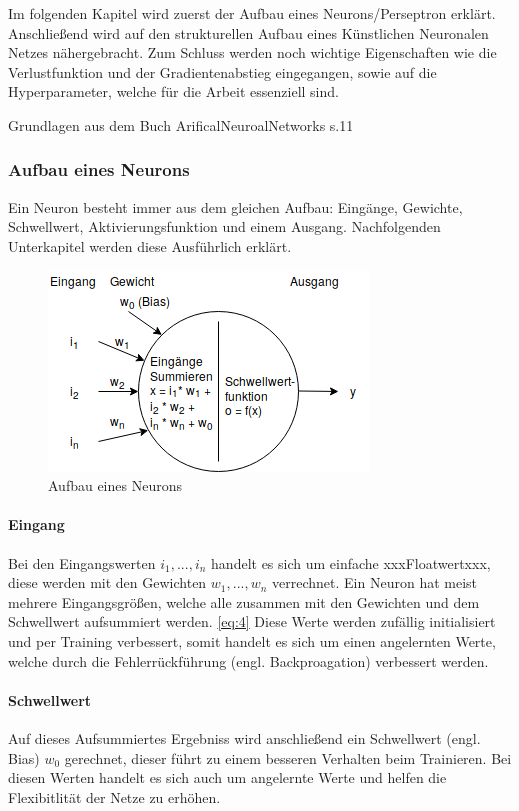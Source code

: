 Im folgenden Kapitel wird zuerst der Aufbau eines Neurons/Perseptron erklärt. Anschließend wird auf den strukturellen Aufbau eines Künstlichen Neuronalen Netzes nähergebracht. Zum Schluss werden noch wichtige Eigenschaften wie die Verlustfunktion und der Gradientenabstieg eingegangen, sowie auf die Hyperparameter, welche für die Arbeit essenziell sind.



Grundlagen aus dem Buch ArificalNeuroalNetworks s.11 


\subsubsection{Aufbau eines Neurons}
\label{Aufbau eines Neurons}
Ein Neuron besteht immer aus dem gleichen Aufbau: Eingänge, Gewichte, Schwellwert, Aktivierungsfunktion und einem Ausgang.
Nachfolgenden Unterkapitel werden diese Ausführlich erklärt.
\begin{figure}[htb]
  \centering  
  \includegraphics[scale=0.9]{img/neuron.png}
  \caption{Aufbau eines Neurons}
  \label{fig:neuron}
\end{figure}


\paragraph{Eingang}
Bei den Eingangswerten $i_1, ..., i_n$ handelt es sich um einfache xxxFloatwertxxx, diese werden mit den Gewichten $w_1, ..., w_n$ verrechnet. Ein Neuron hat meist mehrere Eingangsgrößen, welche alle zusammen mit den Gewichten und dem Schwellwert aufsummiert werden. \ref{eq:4} Diese Werte werden zufällig initialisiert und per Training verbessert, somit handelt es sich um einen angelernten Werte, welche durch die Fehlerrückführung (engl. Backproagation) verbessert werden.

\paragraph{Schwellwert}
Auf dieses Aufsummiertes Ergebniss wird anschließend ein Schwellwert (engl. Bias) $w_0$ gerechnet, dieser führt zu einem besseren Verhalten beim Trainieren. Bei diesen Werten handelt es sich auch um angelernte Werte und helfen die Flexibitlität der Netze zu erhöhen.

